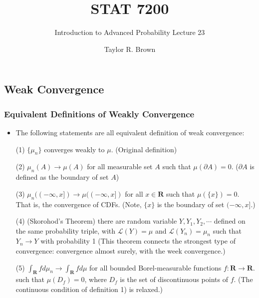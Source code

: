 \documentclass[handout]{beamer}
\title{STAT 7200}
\subtitle{Introduction to Advanced Probability \newline Lecture 23}
\author{Taylor R. Brown}
\institute{}
\date{}
\begin{document}
\frame{\titlepage}


\section[Outline]{}
\frame{\tableofcontents}


\subsection{Weak Convergence}



\frame
{
  \frametitle{Equivalent Definitions of Weakly Convergence} 

   \begin{itemize}

               \item<1->[] \begin{Theorem} The following statements are all equivalent definition of weak convergence:

               (1) $\{\mu_n\}$ converges weakly to $\mu$. (Original definition) 
               \vspace{2mm}
               
                 {\color{blue} (2) $\mu_n(A)\rightarrow \mu(A)$ for all measurable set $A$ such that $\mu(\partial A)=0$. ($\partial A$ is defined as the boundary of set $A$) }
                              \vspace{2mm}

               (3) $\mu_n((-\infty, x])\rightarrow \mu((-\infty, x])$ for all $x\in \mathbf{R}$ such that $\mu(\{x\})=0$. That is, the convergence of CDFs. (Note, $\{x\}$ is the boundary of set $(-\infty, x]$.)
                              \vspace{2mm}

                 {\color{blue}  (4) (Skorohod's Theorem) there are random variable $Y, Y_1, Y_2, \cdots$ defined on the same probability triple, with $\mathcal{L} (Y)=\mu$ and $\mathcal{L} (Y_n)=\mu_n $ such that $Y_n\rightarrow Y$ with probability 1 (This theorem connects the strongest type of convergence: convergence almost surely, with the week convergence.) }
                              \vspace{2mm}

               (5) $\int_{\mathbf{R}}f d\mu_n \rightarrow \int_{\mathbf{R}}f d\mu$ for all bounded Borel-measurable functions $f:\mathbf{R}\rightarrow \mathbf{R}$. such that $\mu(D_f)=0$, where $D_f$ is the set of discontinuous points of $f$. (The continuous condition of definition 1) is relaxed.)
              
                            \end{Theorem}

                                               \end{itemize}
}
\end{document}
